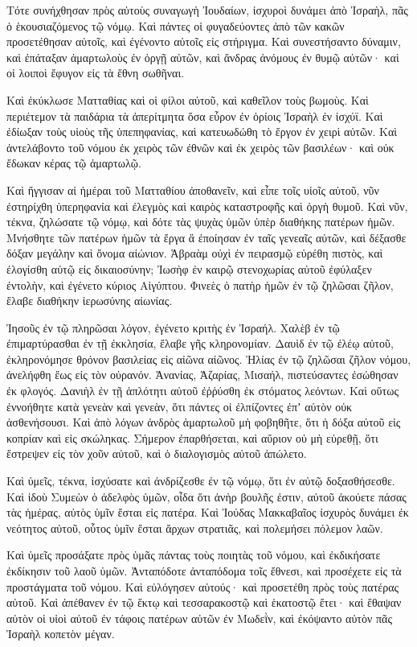 {\par }{\PP {}Τότε συνήχθησαν πρὸς αὐτοὺς συναγωγὴ Ἰουδαίων, ἰσχυροὶ δυνάμει ἀπὸ Ἰσραὴλ, πᾶς ὁ ἑκουσιαζόμενος τῷ νόμῳ.
Καὶ πάντες οἱ φυγαδεύοντες ἀπὸ τῶν κακῶν προσετέθησαν αὐτοῖς, καὶ ἐγένοντο αὐτοῖς εἰς στήριγμα.
Καὶ συνεστήσαντο δύναμιν, καὶ ἐπάταξαν ἁμαρτωλοὺς ἐν ὀργῇ αὐτῶν, καὶ ἄνδρας ἀνόμους ἐν θυμῷ αὐτῶν· καὶ οἱ λοιποὶ ἔφυγον εἰς τὰ ἔθνη σωθῆναι.
\par }{\PP {}Καὶ ἐκύκλωσε Ματταθίας καὶ οἱ φίλοι αὐτοῦ, καὶ καθεῖλον τοὺς βωμοὺς.
Καὶ περιέτεμον τὰ παιδάρια τὰ ἀπερίτμητα ὅσα εὗρον ἐν ὁρίοις Ἰσραὴλ ἐν ἰσχύϊ.
Καὶ ἐδίωξαν τοὺς υἱοὺς τῆς ὑπεπηφανίας, καὶ κατευωδώθη τὸ ἔργον ἐν χειρὶ αὐτῶν.
Καὶ ἀντελάβοντο τοῦ νόμου ἐκ χειρὸς τῶν ἐθνῶν καὶ ἐκ χειρὸς τῶν βασιλέων· καὶ οὐκ ἔδωκαν κέρας τῷ ἁμαρτωλῷ.
\par }{\PP {}Καὶ ἤγγισαν αἱ ἡμέραι τοῦ Ματταθίου ἀποθανεῖν, καὶ εἶπε τοῖς υἱοῖς αὐτοῦ, νῦν ἐστηρίχθη ὑπερηφανία καὶ ἐλεγμὸς καὶ καιρὸς καταστροφῆς καὶ ὀργὴ θυμοῦ.
Καὶ νῦν, τέκνα, ζηλώσατε τῷ νόμῳ, καὶ δότε τὰς ψυχὰς ὑμῶν ὑπὲρ διαθήκης πατέρων ἡμῶν.
Μνήσθητε τῶν πατέρων ἡμῶν τὰ ἔργα ἃ ἐποίησαν ἐν ταῖς γενεαῖς αὐτῶν, καὶ δέξασθε δόξαν μεγάλην καὶ ὄνομα αἰώνιον.
Ἁβραὰμ οὐχὶ ἐν πειρασμῷ εὑρέθη πιστὸς, καὶ ἐλογίσθη αὐτῷ εἰς δικαιοσύνην;
Ἰωσὴφ ἐν καιρῷ στενοχωρίας αὐτοῦ ἐφύλαξεν ἐντολὴν, καὶ ἐγένετο κύριος Αἰγύπτου.
Φινεὲς ὁ πατὴρ ἡμῶν ἐν τῷ ζηλῶσαι ζῆλον, ἔλαβε διαθήκην ἱερωσύνης αἰωνίας.
\par }{\PP {}Ἰησοῦς ἐν τῷ πληρῶσαι λόγον, ἐγένετο κριτὴς ἐν Ἰσραήλ.
Χαλὲβ ἐν τῷ ἐπιμαρτύρασθαι ἐν τῇ ἐκκλησία, ἔλαβε γῆς κληρονομίαν.
Δαυὶδ ἐν τῷ ἐλέῳ αὐτοῦ, ἐκληρονόμησε θρόνον βασιλείας εἰς αἰῶνα αἰῶνος.
Ἡλίας ἐν τῷ ζηλῶσαι ζῆλον νόμου, ἀνελήφθη ἕως εἰς τὸν οὐρανόν.
Ἀνανίας, Ἀζαρίας, Μισαήλ, πιστεύσαντες ἐσώθησαν ἐκ φλογός.
Δανιὴλ ἐν τῇ ἁπλότητι αὐτοῦ ἐῤῥύσθη ἐκ στόματος λεόντων.
Καὶ οὕτως ἐννοήθητε κατὰ γενεὰν καὶ γενεὰν, ὅτι πάντες οἱ ἐλπίζοντες ἐπʼ αὐτὸν οὐκ ἀσθενήσουσι.
Καὶ ἀπὸ λόγων ἀνδρὸς ἁμαρτωλοῦ μὴ φοβηθῆτε, ὅτι ἡ δόξα αὐτοῦ εἰς κοπρίαν καὶ εἰς σκώληκας.
Σήμερον ἐπαρθήσεται, καὶ αὔριον οὐ μὴ εὑρεθῇ, ὅτι ἔστρεψεν εἰς τὸν χοῦν αὐτοῦ, καὶ ὁ διαλογισμὸς αὐτοῦ ἀπώλετο.
\par }{\PP {}Καὶ ὑμεῖς, τέκνα, ἰσχύσατε καὶ ἀνδρίζεσθε ἐν τῷ νόμῳ, ὅτι ἐν αὐτῷ δοξασθήσεσθε.
Καὶ ἰδοὺ Συμεὼν ὁ ἀδελφὸς ὑμῶν, οἶδα ὅτι ἀνὴρ βουλῆς ἐστιν, αὐτοῦ ἀκούετε πάσας τὰς ἡμέρας, αὐτὸς ὑμῖν ἔσται εἰς πατέρα.
Καὶ Ἰούδας Μακκαβαῖος ἰσχυρὸς δυνάμει ἐκ νεότητος αὐτοῦ, οὗτος ὑμῖν ἔσται ἄρχων στρατιᾶς, καὶ πολεμήσει πόλεμον λαῶν.
\par }{\PP {}Καὶ ὑμεῖς προσάξατε πρὸς ὑμᾶς πάντας τοὺς ποιητὰς τοῦ νόμου, καὶ ἐκδικήσατε ἐκδίκησιν τοῦ λαοῦ ὑμῶν.
Ἀνταπόδοτε ἀνταπόδομα τοῖς ἔθνεσι, καὶ προσέχετε εἰς τὰ προστάγματα τοῦ νόμου.
Καὶ εὐλόγησεν αὐτούς· καὶ προσετέθη πρὸς τοὺς πατέρας αὐτοῦ.
Καὶ ἀπέθανεν ἐν τῷ ἕκτῳ καὶ τεσσαρακοστῷ καὶ ἑκατοστῷ ἔτει· καὶ ἔθαψαν αὐτὸν οἱ υἱοὶ αὐτοῦ ἐν τάφοις πατέρων αὐτῶν ἐν Μωδεῒν, καὶ ἐκόψαντο αὐτὸν πᾶς Ἰσραὴλ κοπετὸν μέγαν.

}
